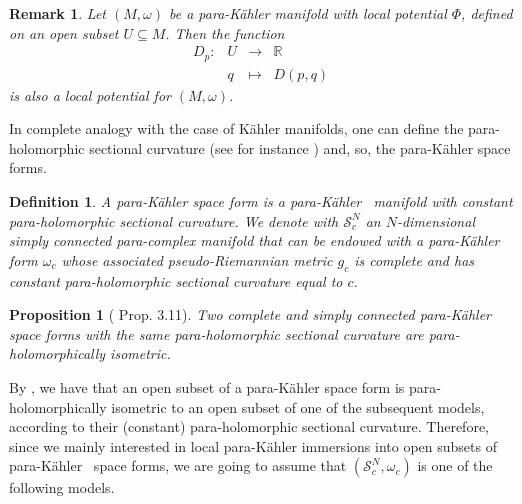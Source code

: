 \documentclass{article}
\newtheorem{df}[thm]{Definition}
\newtheorem{prop}[thm]{Proposition}
\newtheorem{rem}[thm]{Remark}
\newcommand{\R}{\mathds{R}}
\newcommand{\s}{\mathcal{S}}
\newcommand{\pk}{para-K\"ahler }
\begin{document}
\begin{rem}\label{D0}
Let $(M,\omega)$ be a \pk manifold with local potential $\Phi$, defined on an open subset $U\subseteq M$. Then the function 
$$\begin{array}{rccc}
D_{p}: & U&\longrightarrow & \R\\
&q&\longmapsto&D(p,q)
\end{array}$$ is also a local potential for $(M,\omega)$.
\end{rem}



In complete analogy with the case of K\"ahler manifolds, one can define the para-holomorphic sectional curvature (see for instance \cite{gm}) and, so, the \pk space forms.
\begin{df}
A \emph{\pk space form} is a \pk\ manifold with constant para-holomorphic sectional curvature. 
We denote with $\s_c^N$ an $N$-dimensional simply connected para-complex manifold that can be endowed  with a \pk form $\omega_c$ whose associated pseudo-Riemannian metric $g_c$ is complete and has constant para-holomorphic sectional curvature equal to $c$.
\end{df}



\begin{prop}[\cite{gm} Prop. 3.11]
Two complete and simply connected \pk space forms with the same para-holomorphic sectional curvature are para-holomorphically isometric. 
\end{prop}

\noindent By \cite{gm}, we have that  an open subset of a \pk space form is para-holomorphically isometric to an open subset of one  of the subsequent models, according to their (constant) para-holomorphic sectional curvature. Therefore, since we mainly interested in local \pk immersions into open subsets of \pk\ space forms, we are going to assume that  $\left(\s_c^N,\omega_c\right)$  is  one of the following models.
\end{document}
